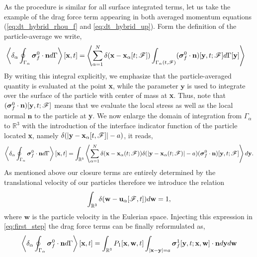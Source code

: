 As the procedure is similar for all surface integrated terms, let us take the example of the drag force term appearing in both averaged momentum equations (\ref{eq:dt_hybrid_rhou_f} and \ref{eq:dt_hybrid_up}). 
Form the definition of the particle-average we write,
\begin{align}
    \left<\delta_\alpha \oint_{\Gamma_\alpha} \bm\sigma_f^0\cdot\textbf{n} d\Gamma\right>[\textbf{x},t]
    &= \left< \sum_{\alpha=1}^N \delta(\textbf{x}-\textbf{x}_\alpha[t; \mathscr{F}])
    \int_{\Gamma_\alpha(t,\mathscr{F})}
    (\bm\sigma_f^0\cdot\textbf{n})[\textbf{y},t;\mathscr{F}]
    d\Gamma[\textbf{y}] \right>
    \label{eq:first_step}
\end{align}
By writing this integral explicitly, we emphasize that the particle-averaged quantity is evaluated at the point \textbf{x}, while the parameter $\textbf{y}$ is used to integrate over the surface of the particle with center of mass at \textbf{x}. 
Thus, note that $(\bm\sigma_f^0\cdot\textbf{n})[\textbf{y},t;\mathscr{F}]$ means that we evaluate the local stress as well as the local normal $\textbf{n}$ to the particle at \textbf{y}. 
We now enlarge the domain of integration from $\Gamma_\alpha$ to $\mathbb{R}^3$ with the introduction of the interface indicator function of the particle located \textbf{x}, namely $\delta(|\textbf{y} - \textbf{x}_\alpha[t,\mathscr{F}]| - a)$, 
it reads,
\begin{equation}
    \left<\delta_\alpha \oint_{\Gamma_\alpha} \bm\sigma_f^0\cdot\textbf{n} d\Gamma\right>[\textbf{x},t]
    = 
    \int_{\mathbb{R}^3}
    \left<
     \sum_{\alpha=1}^N 
     \delta(\textbf{x}-\textbf{x}_\alpha(t; \mathscr{F}))
    \delta(|\textbf{y} - \textbf{x}_{\alpha}(t;\mathscr{F})|-a)
    (\bm\sigma_f^0\cdot\textbf{n})[\textbf{y},t;\mathscr{F}]
    \right>
    d\textbf{y}. 
\end{equation} 
As mentioned above our closure terms are entirely determined by the translational velocity of our particles therefore we introduce the relation 
\begin{equation*}
    \int_{\mathbb{R}^3} \delta(\textbf{w} - \textbf{u}_\alpha[\mathscr{F},t]) d\textbf{w} = 1,
\end{equation*}
where $\textbf{w}$ is the particle velocity in the Eulerian space. 
Injecting this expression in \ref{eq:first_step} the drag force terms can be finally reformulated as, 
\begin{equation}
    \left<\delta_\alpha \oint_{\Gamma_\alpha} \bm\sigma_f^0\cdot\textbf{n} d\Gamma\right>[\textbf{x},t]
    =
    \int_{\mathbb{R}^3}
    P_1[\textbf{x},\textbf{w},t]
    \int_{|\textbf{x}-\textbf{y}|=a}
    \bm\sigma_f^1[\textbf{y},t;\textbf{x},\textbf{w}] \cdot \textbf{n}
    d\textbf{y}
    d\textbf{w}
    \label{eq:conditionally_averaged}
\end{equation}
